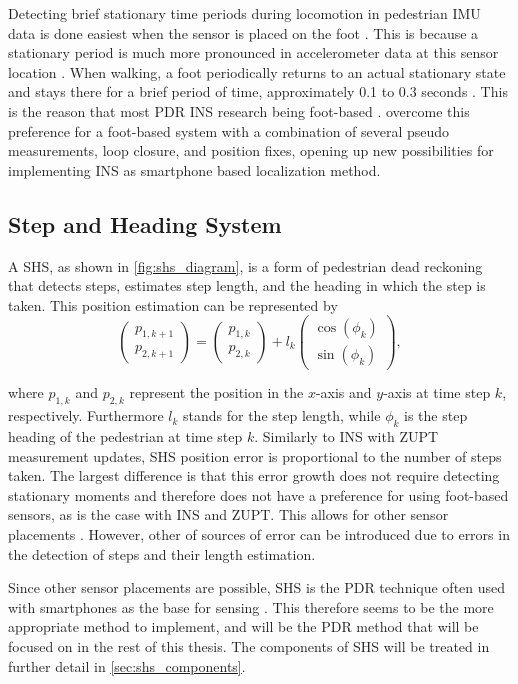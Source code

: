 Detecting brief stationary time periods during locomotion in pedestrian \ac{IMU} data is done easiest when the sensor is placed on the foot \cite{Diez2018,Davidson2017}. This is because a stationary period is much more pronounced in accelerometer data at this sensor location \cite{Yu2019,Wu2019}.  When walking, a foot periodically returns to an actual stationary state and stays there for a brief period of time, approximately 0.1 to 0.3 seconds \cite{Ren2016a}. This is the reason that most \ac{PDR} \ac{INS} research being foot-based \cite{Diez2018,Wu2019}. \citet{Solin2018a} overcome this preference for a foot-based system with a combination of several pseudo measurements, loop closure, and position fixes, opening up new possibilities for implementing INS as smartphone based localization method.

\subsection{Step and Heading System }

A \acf{SHS}, as shown in \cref{fig:shs_diagram}, is a form of pedestrian dead reckoning that detects steps, estimates step length, and the heading in which the step is taken. This position estimation can be represented by \cite{MunozDiaz2019}
\begin{equation}
	\label{eq:SHS_dynamic_model}
	\left(\begin{array}{l}
		p_{1,k+1} \\
		p_{2,k+1}
	\end{array}\right) 
	=
	\left(\begin{array}{l}
		p_{1,k} \\
		p_{2,k}
	\end{array}\right) 
	+l_{k} \left(\begin{array}{l}
		\cos \left(\phi_{k}\right) \\
		\sin \left(\phi_{k}\right)
	\end{array}\right),
\end{equation}

where $p_{1,k}$  and  $p_{2,k}$ represent the position in the $x$-axis and $y$-axis at time step  $k$, respectively. Furthermore $l_{k}$ stands for the step length, while $\phi_{k}$ is the step heading of the pedestrian at time step $k$.
Similarly to INS with ZUPT measurement updates, \ac{SHS} position error is proportional to the number of steps taken. The largest difference is that this error growth does not require detecting stationary moments and therefore does not have a preference for using foot-based sensors, as is the case with INS and ZUPT. This allows for other sensor placements \cite{Diez2018b}. However, other of sources of error can be introduced due to errors in the detection of steps and their length estimation. \par 
Since other sensor placements are possible, \ac{SHS} is the PDR technique often used with smartphones as the base for sensing \cite{Kang2015}. This therefore seems to be the more appropriate method to implement, and will be the \ac{PDR} method that will be focused on in the rest of this thesis. The components of \ac{SHS} will be treated in further detail in \cref{sec:shs_components}.

